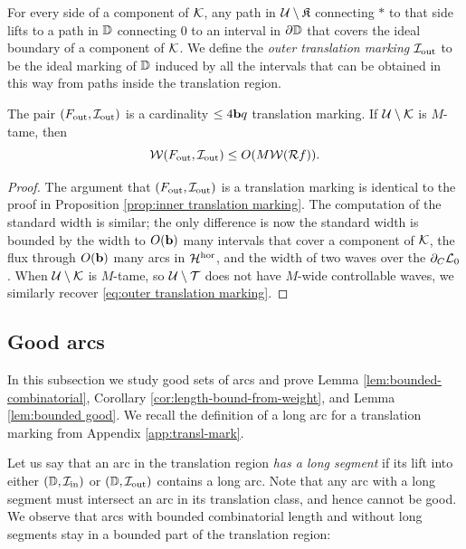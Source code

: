 \documentclass[12pt]{amsart}
\begin{document}
For every side of a component of $\mathcal K$, any path in $\mathcal U\setminus \mathfrak{K}$ connecting $*$ to that side lifts to a path in $\mathbb D$ connecting $0$ to an interval in $\partial \mathbb D$ that covers the ideal boundary of a component of $\mathcal K$.  We define the \textit{outer translation marking} $\mathcal I_{\mathrm{out}}$  to be the ideal marking of $\mathbb D$ induced by all the intervals that can be obtained in this way from paths inside the translation region.


\begin{prop}\label{prop:outer translation marking}
	The pair $(F_{\mathrm{out}}, \mathcal I_{\mathrm{out}})$ is a cardinality $\leq 4\mathbf b q$ translation marking. If $\mathcal U\setminus \mathcal K$ is $M$-tame, then 
	\begin{equation}\label{eq:outer translation marking}
		\mathcal W(F_{\mathrm{out}}, \mathcal I_{\mathrm{out}})\leq O(M\mathcal W(\mathcal R f)).
	\end{equation}	
\end{prop}
\begin{proof}
	The argument that $(F_{\mathrm{out}}, \mathcal I_{\mathrm{out}})$ is a translation marking is identical to the proof in Proposition \ref{prop:inner translation marking}. The computation of the standard width is similar; the only difference is now the standard width is bounded by the width to $O(\mathbf b)$ many intervals that cover a component of $\mathcal K$, the flux through $O(\mathbf b)$ many arcs in $\mathcal H^{\mathrm{hor}}$, and the width of two waves over the $\partial_C\mathcal L_0$. 
	When $\mathcal U\setminus \mathcal K$ is $M$-tame, so $\mathcal U\setminus \mathcal T$ does not have $M$-wide controllable waves, we similarly recover \eqref{eq:outer translation marking}.
\end{proof}


\subsection{Good arcs}\label{sec:good arcs}

In this subsection we study good sets of arcs and prove Lemma \ref{lem:bounded-combinatorial}, Corollary \ref{cor:length-bound-from-weight}, and Lemma \ref{lem:bounded good}. We recall the definition of a long arc for a translation marking from Appendix \ref{app:transl-mark}.


Let us say that an arc in the translation region  \textit{has a long segment}  if its lift into either $(\mathbb D, \mathcal I_{\mathrm{in}})$ or $(\mathbb D, \mathcal I_{\mathrm{out}})$ contains a long arc.
Note that any arc with a long segment must intersect an arc in its translation class, and hence cannot be good. 
We observe that arcs with bounded combinatorial length and without long segments stay in a bounded part of the translation region:
\end{document}
